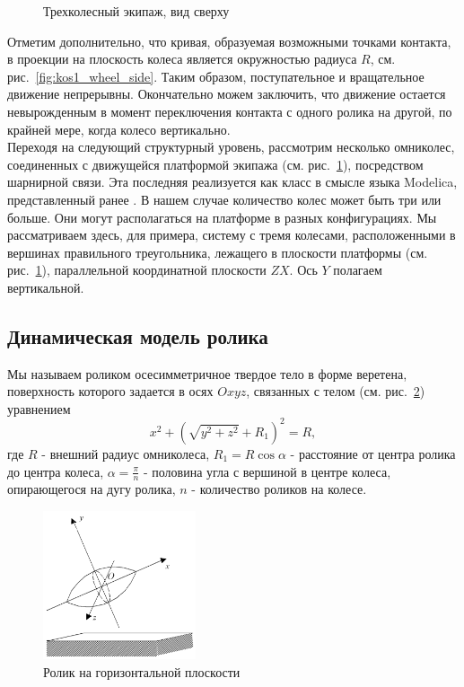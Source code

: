 \documentclass[12pt]{article}
\begin{document}
\begin{figure}
\begin{minipage}{.47\textwidth}
    \caption{Трехколесный экипаж, вид сверху}
    \label{fig:kos2_vehicle}
\end{minipage}
\end{figure}


Отметим дополнительно, что кривая, образуемая возможными точками контакта, в проекции на плоскость колеса является окружностью радиуса $R$, см. рис.~\ref{fig:kos1_wheel_side}. Таким образом, поступательное и вращательное движение непрерывны. Окончательно можем заключить, что движение остается невырожденным в момент переключения контакта с одного ролика на другой, по крайней мере, когда колесо вертикально.\\

Переходя на следующий структурный уровень, рассмотрим несколько омниколес, соединенных с движущейся платформой экипажа (см. рис.~\ref{fig:kos2_vehicle}), посредством шарнирной связи. Эта последняя реализуется как класс в смысле языка Modelica, представленный ранее \cite{kos5}. В нашем случае количество колес может быть три или больше. Они могут располагаться на платформе в разных конфигурациях. Мы рассматриваем здесь, для примера, систему с тремя колесами, расположенными в вершинах правильного треугольника, лежащего в плоскости платформы (см. рис.~\ref{fig:kos2_vehicle}), параллельной координатной плоскости $ZX$. Ось $Y$ полагаем вертикальной.\\

\subsection{Динамическая модель ролика}

Мы называем роликом осесимметричное твердое тело в форме веретена, поверхность которого задается в осях $Oxyz$, связанных с телом (см. рис.~\ref{fig:kos3_roller_frame}) уравнением
\begin{equation}
    x^2 + (\sqrt{y^2+z^2} + R_1)^2 = R,
\end{equation}
где $R$ - внешний радиус омниколеса, $R_1 = R\cos\alpha$ - расстояние от центра ролика до центра колеса, $\alpha = \frac{\pi}{n}$ - половина угла с вершиной в центре колеса, опирающегося на дугу ролика, $n$ - количество роликов на колесе.\\

\begin{figure}[h]
    \centering
    \includegraphics[width=0.4\textwidth]{img/art/kos3_roller_frame.png}
    \caption{Ролик на горизонтальной плоскости}
    \label{fig:kos3_roller_frame}
\end{figure}
\end{document}
